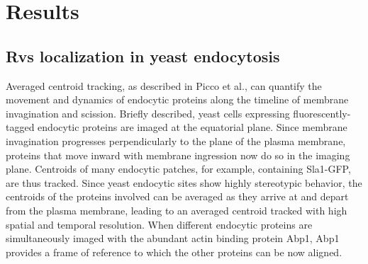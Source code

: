 \chapter{Results}    
\label{Ch:results}

\section{Rvs localization in yeast endocytosis}

Averaged centroid tracking, as described in Picco et al., can quantify the movement and dynamics of endocytic proteins along the timeline of membrane invagination and scission. Briefly described, yeast cells expressing fluorescently-tagged endocytic proteins are imaged at the equatorial plane. Since membrane invagination progresses perpendicularly to the plane of the plasma membrane, proteins that move inward with membrane ingression now do so in the imaging plane. Centroids of many endocytic patches, for example, containing Sla1-GFP, are thus tracked. Since yeast endocytic sites show highly stereotypic behavior, the centroids of the proteins involved can be averaged as they arrive at and depart from the plasma membrane, leading to an averaged centroid tracked with high spatial and temporal resolution. When different endocytic proteins are simultaneously imaged with the abundant actin binding protein Abp1, Abp1 provides a frame of reference to which the other proteins can be now aligned. 


